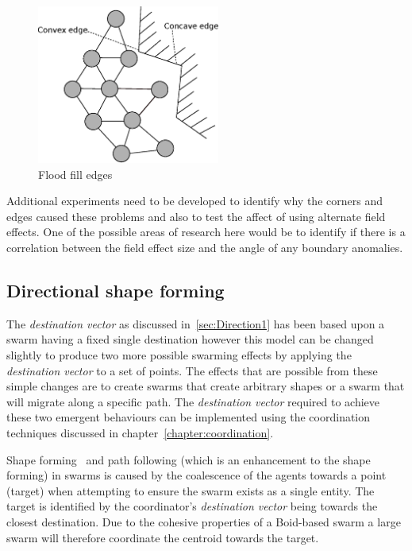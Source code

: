 \begin{figure}[H]
\begin{center}
\includegraphics[width=6cm]{CHAPTER-9/figures/FloodEdges1}
\end{center}
\caption{Flood fill edges\label{additional:FloodEdges1}}
\end{figure}

Additional experiments need to be developed to identify why the corners and edges caused these problems and also to test the affect of using alternate field effects. One of the possible areas of research here would be to identify if there is a correlation between the field effect size and the angle of any boundary anomalies.
 
\subsection{Directional shape forming}\label{sec:DirectionalShape1}
The \textit{destination vector} as discussed in~\autoref{sec:Direction1} has been based upon a swarm having a fixed single destination however this model can be changed slightly to produce two more possible swarming effects by applying the \textit{destination vector} to a set of points. The effects that are possible from these simple changes are to create swarms that create arbitrary shapes or a swarm that will migrate along a specific path. The \textit{destination vector} required to achieve these two emergent behaviours can be implemented using the coordination techniques discussed in chapter~\ref{chapter:coordination}.

Shape forming~\cite{EP:07} and path following (which is an enhancement to the shape forming) in swarms is caused by the coalescence of the agents towards a point (target) when attempting to ensure the swarm exists as a single entity. The target is identified by the coordinator's \textit{destination vector} being towards the closest destination. Due to the cohesive properties of a Boid-based swarm a large swarm will therefore coordinate the centroid towards the target.


